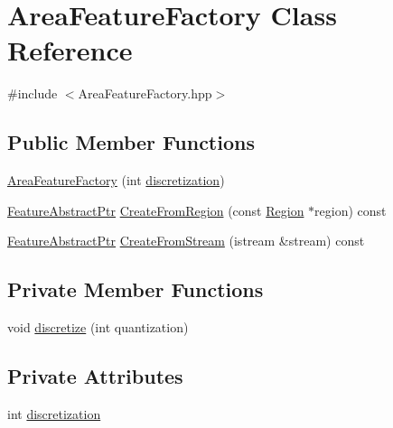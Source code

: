 \hypertarget{class_area_feature_factory}{\section{Area\+Feature\+Factory Class Reference}
\label{class_area_feature_factory}
}


{\ttfamily \#include $<$Area\+Feature\+Factory.\+hpp$>$}

\subsection*{Public Member Functions}
\begin{DoxyCompactItemize}
\item 
\hyperlink{class_area_feature_factory_a1299cd28490bc46f5ee66e16b712e37d}{Area\+Feature\+Factory} (int \hyperlink{class_area_feature_factory_a77f36879829aeb6c25e7da509649b1ef}{discretization})
\item 
\hyperlink{class_feature_abstract_ptr}{Feature\+Abstract\+Ptr} \hyperlink{class_area_feature_factory_a241e29fcaf19c4756c7d01e86b272be3}{Create\+From\+Region} (const \hyperlink{class_region}{Region} $\ast$region) const 
\item 
\hyperlink{class_feature_abstract_ptr}{Feature\+Abstract\+Ptr} \hyperlink{class_area_feature_factory_ab8d7d3ebe9a928d340b4215d872e51ec}{Create\+From\+Stream} (istream \&stream) const 
\end{DoxyCompactItemize}
\subsection*{Private Member Functions}
\begin{DoxyCompactItemize}
\item 
void \hyperlink{class_area_feature_factory_a9e08ded8fb8dcf407edd0d7ec328129b}{discretize} (int quantization)
\end{DoxyCompactItemize}
\subsection*{Private Attributes}
\begin{DoxyCompactItemize}
\item 
int \hyperlink{class_area_feature_factory_a77f36879829aeb6c25e7da509649b1ef}{discretization}
\end{DoxyCompactItemize}


